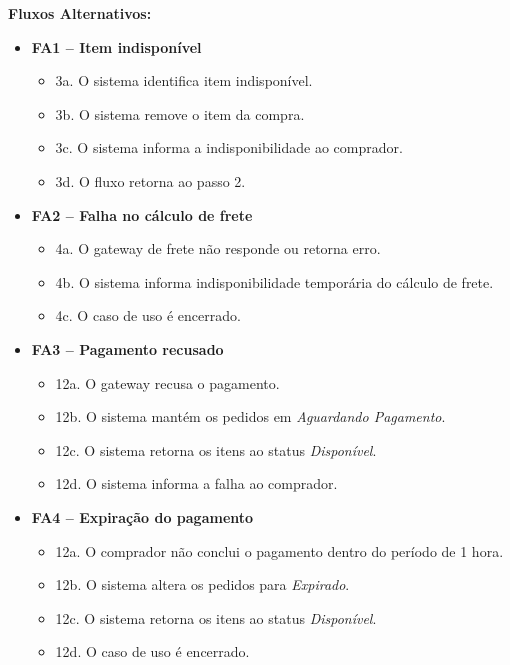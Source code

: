 ﻿\documentclass[12pt,a4paper]{article}
\begin{document}
\vspace{0.5em}
\noindent\textbf{Fluxos Alternativos:}
\begin{itemize}[leftmargin=*]
    \item \textbf{FA1 – Item indisponível}
    \begin{itemize}[label={}, leftmargin=0.5cm]
        \item 3a. O sistema identifica item indisponível.
        \item 3b. O sistema remove o item da compra.
        \item 3c. O sistema informa a indisponibilidade ao comprador.
        \item 3d. O fluxo retorna ao passo 2.
    \end{itemize}
    
    \item \textbf{FA2 – Falha no cálculo de frete}
    \begin{itemize}[label={}, leftmargin=0.5cm]
        \item 4a. O gateway de frete não responde ou retorna erro.
        \item 4b. O sistema informa indisponibilidade temporária do cálculo de frete.
        \item 4c. O caso de uso é encerrado.
    \end{itemize}

    \item \textbf{FA3 – Pagamento recusado}
    \begin{itemize}[label={}, leftmargin=0.5cm]
        \item 12a. O gateway recusa o pagamento.
        \item 12b. O sistema mantém os pedidos em \textit{Aguardando Pagamento}.
        \item 12c. O sistema retorna os itens ao status \textit{Disponível}.
        \item 12d. O sistema informa a falha ao comprador.
    \end{itemize}

    \item \textbf{FA4 – Expiração do pagamento}
    \begin{itemize}[label={}, leftmargin=0.5cm]
        \item 12a. O comprador não conclui o pagamento dentro do período de 1 hora.
        \item 12b. O sistema altera os pedidos para \textit{Expirado}.
        \item 12c. O sistema retorna os itens ao status \textit{Disponível}.
        \item 12d. O caso de uso é encerrado.
    \end{itemize}
\end{itemize}
\end{document}

